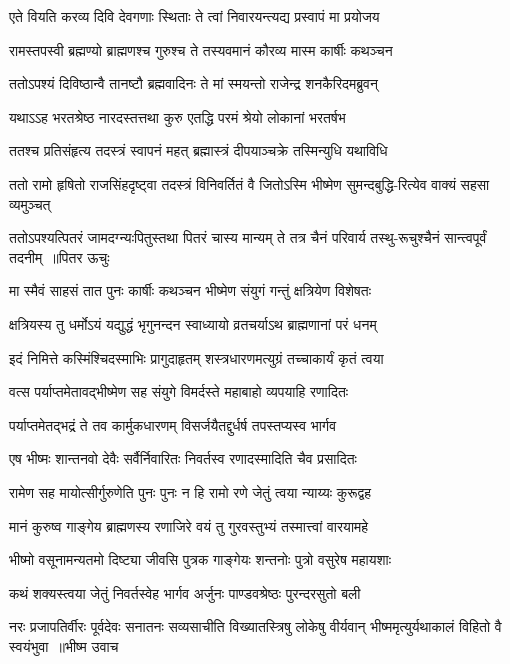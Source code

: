 \twolineshloka
{एते वियति करव्य दिवि देवगणाः स्थिताः}
{ते त्वां निवारयन्त्यद्य प्रस्वापं मा प्रयोजय}


\twolineshloka
{रामस्तपस्वी ब्रह्मण्यो ब्राह्मणश्च गुरुश्च ते}
{तस्यवमानं कौरव्य मास्म कार्षीः कथञ्चन}


\twolineshloka
{ततोऽपश्यं दिविष्ठान्वै तानष्टौ ब्रह्मवादिनः}
{ते मां स्मयन्तो राजेन्द्र शनकैरिदमब्रुवन्}


\twolineshloka
{यथाऽऽह भरतश्रेष्ठ नारदस्तत्तथा कुरु}
{एतद्धि परमं श्रेयो लोकानां भरतर्षभ}


\twolineshloka
{ततश्च प्रतिसंहृत्य तदस्त्रं स्वापनं महत्}
{ब्रह्मास्त्रं दीपयाञ्चक्रे तस्मिन्युधि यथाविधि}


\twolineshloka
{ततो रामो हृषितो राजसिंहदृष्ट्वा तदस्त्रं विनिवर्तितं वै}
{जितोऽस्मि भीष्मेण सुमन्दबुद्धि-रित्येव वाक्यं सहसा व्यमुञ्चत्}


\threelineshloka
{ततोऽपश्यत्पितरं जामदग्न्यःपितुस्तथा पितरं चास्य मान्यम्}
{ते तत्र चैनं परिवार्य तस्थु-रूचुश्चैनं सान्त्वपूर्वं तदनीम् ॥पितर ऊचुः}
{}


\twolineshloka
{मा स्मैवं साहसं तात पुनः कार्षीः कथञ्चन}
{भीष्मेण संयुगं गन्तुं क्षत्रियेण विशेषतः}


\twolineshloka
{क्षत्रियस्य तु धर्मोऽयं यद्युद्धं भृगुनन्दन}
{स्वाध्यायो व्रतचर्याऽथ ब्राह्मणानां परं धनम्}


\twolineshloka
{इदं निमित्ते कस्मिंश्चिदस्माभिः प्रागुदाहृतम्}
{शस्त्रधारणमत्युग्रं तच्चाकार्यं कृतं त्वया}


\twolineshloka
{वत्स पर्याप्तमेतावद्भीष्मेण सह संयुगे}
{विमर्दस्ते महाबाहो व्यपयाहि रणादितः}


\twolineshloka
{पर्याप्तमेतद्भद्रं ते तव कार्मुकधारणम्}
{विसर्जयैतद्दुर्धर्ष तपस्तप्यस्व भार्गव}


\twolineshloka
{एष भीष्मः शान्तनवो देवैः सर्वैर्निवारितः}
{निवर्तस्व रणादस्मादिति चैव प्रसादितः}


\twolineshloka
{रामेण सह मायोत्सीर्गुरुणेति पुनः पुनः}
{न हि रामो रणे जेतुं त्वया न्याय्यः कुरूद्वह}


\twolineshloka
{मानं कुरुष्व गाङ्गेय ब्राह्मणस्य रणाजिरे}
{वयं तु गुरवस्तुभ्यं तस्मात्त्वां वारयामहे}


\twolineshloka
{भीष्मो वसूनामन्यतमो दिष्ट्या जीवसि पुत्रक}
{गाङ्गेयः शन्तनोः पुत्रो वसुरेष महायशाः}


\twolineshloka
{कथं शक्यस्त्वया जेतुं निवर्तस्वेह भार्गव}
{अर्जुनः पाण्डवश्रेष्ठः पुरन्दरसुतो बली}


\fourlineindentedshloka
{नरः प्रजापतिर्वीरः पूर्वदेवः सनातनः}
{सव्यसाचीति विख्यातस्त्रिषु लोकेषु वीर्यवान्}
{भीष्ममृत्युर्यथाकालं विहितो वै स्वयंभुवा ॥भीष्म उवाच}
{}


